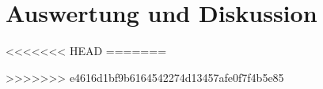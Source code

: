 
\chapter{Auswertung und Diskussion}
\label{chap:versuchsauswertung}



<<<<<<< HEAD
=======

>>>>>>> e4616d1bf9b6164542274d13457afe0f7f4b5e85


